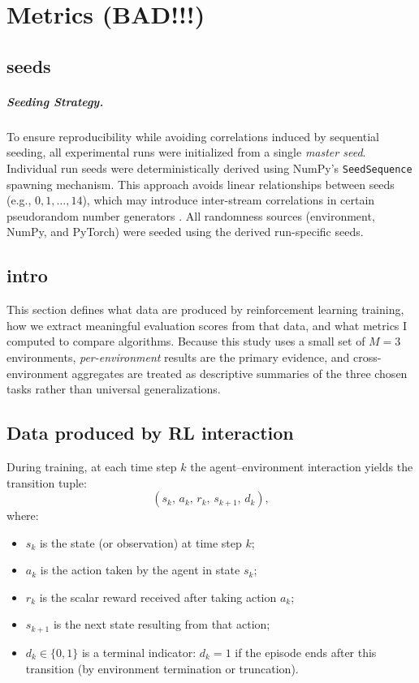 



\chapter{Metrics (BAD!!!)}




\section{seeds}
\paragraph{Seeding Strategy.}
To ensure reproducibility while avoiding correlations induced by sequential seeding,
all experimental runs were initialized from a single \emph{master seed}.
Individual run seeds were deterministically derived using NumPy's
\texttt{SeedSequence} spawning mechanism.
This approach avoids linear relationships between seeds (e.g., $0,1,\dots,14$),
which may introduce inter-stream correlations in certain pseudorandom number
generators
\cite{matsumotoCommonDefectsInitialization2007}.
All randomness sources (environment, NumPy, and PyTorch) were seeded
using the derived run-specific seeds.



\section{intro}
This section defines what data are produced by reinforcement learning training, how we extract
meaningful evaluation scores from that data, and what metrics I computed to compare algorithms.
Because this study uses a small set of $M=3$ environments, \emph{per-environment} results are
the primary evidence, and cross-environment aggregates are treated as descriptive summaries
of the three chosen tasks rather than universal generalizations. \cite{agarwal2021precipice,patterson2024edrl}



\section{Data produced by RL interaction}

During training, at each time step $k$ the agent–environment interaction yields the transition tuple:
\[
(s_k,\,a_k,\,r_k,\,s_{k+1},\,d_k),
\]
where:
\begin{itemize}
  \item $s_k$ is the state (or observation) at time step $k$;
  \item $a_k$ is the action taken by the agent in state $s_k$;
  \item $r_k$ is the scalar reward received after taking action $a_k$;
  \item $s_{k+1}$ is the next state resulting from that action;
  \item $d_k\!\in\!\{0,1\}$ is a terminal indicator: $d_k=1$ if the episode ends after this transition
        (by environment termination or truncation).
\end{itemize}


